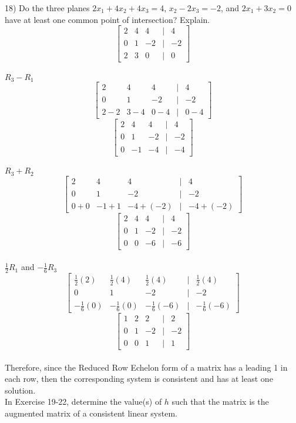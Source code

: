 \documentclass[]{article}
\begin{document}
18) Do the three planes $2x_1+4x_2+4x_3=4$, $x_2-2x_3=-2$, and $2x_1+3x_2=0$ have at least one common point of intersection? Explain.\\
\[
\begin{bmatrix}
	2&4&4&|&4\\
	0&1&-2&|&-2\\
	2&3&0&|&0
\end{bmatrix}	
\]\\
$R_3-R_1$
\[
\begin{bmatrix}
	2&4&4&|&4\\
	0&1&-2&|&-2\\
	2-2&3-4&0-4&|&0-4
\end{bmatrix}
\]
\[
\begin{bmatrix}
	2&4&4&|&4\\
	0&1&-2&|&-2\\
	0&-1&-4&|&-4
\end{bmatrix}
\]\\
$R_3+R_2$
\[
\begin{bmatrix}
	2&4&4&|&4\\
	0&1&-2&|&-2\\
	0+0&-1+1&-4+(-2)&|&-4+(-2)
\end{bmatrix}
\]
\[
\begin{bmatrix}
	2&4&4&|&4\\
	0&1&-2&|&-2\\
	0&0&-6&|&-6
\end{bmatrix}
\]\\
$\frac{1}{2}R_1$ and $-\frac{1}{6}R_3$
\[
\begin{bmatrix}
	\frac{1}{2}(2)&\frac{1}{2}(4)&\frac{1}{2}(4)&|&\frac{1}{2}(4)\\
	0&1&-2&|&-2\\
	-\frac{1}{6}(0)&-\frac{1}{6}(0)&-\frac{1}{6}(-6)&|&-\frac{1}{6}(-6)
\end{bmatrix}
\]
\[
\begin{bmatrix}
	1&2&2&|&2\\
	0&1&-2&|&-2\\
	0&0&1&|&1
\end{bmatrix}
\]\\
Therefore, since the Reduced Row Echelon form of a matrix has a leading 1 in each row, then the corresponding system is consistent and has at least one solution.\\

In Exercise 19-22, determine the value(s) of $h$ such that the matrix is the augmented matrix of a consistent linear system.\\
\end{document}
